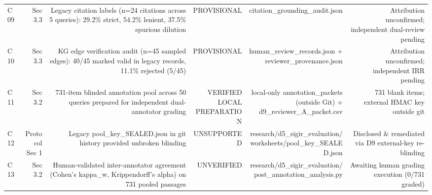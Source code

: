 \begin{table}[t]
\begin{tabular}{lrrrrr}
C09 & Sec 3.3 & Legacy citation labels (n=24 citations across 5 queries): 29.2\% strict, 54.2\% lenient, 37.5\% spurious dilution & PROVISIONAL & citation\_grounding\_audit.json & Attribution unconfirmed; independent dual-review pending \\
C10 & Sec 3.3 & KG edge verification audit (n=45 sampled edges): 40/45 marked valid in legacy records, 11.1\% rejected (5/45) & PROVISIONAL & human\_review\_records.json + reviewer\_provenance.json & Attribution unconfirmed; independent IRR pending \\
C11 & Sec 3.2 & 731-item blinded annotation pool across 50 queries prepared for independent dual-annotator grading & VERIFIED LOCAL PREPARATION & local-only annotation\_packets (outside Git) + d9\_reviewer\_A\_packet.csv & 731 blank items; external HMAC key outside git \\
C12 & Protocol Sec 1 & Legacy pool\_key\_SEALED.json in git history provided unbroken blinding & UNSUPPORTED & research/d5\_sigir\_evaluation/worksheets/pool\_key\_SEALED.json & Disclosed \& remediated via D9 external-key re-blinding \\
C13 & Sec 3.2 & Human-validated inter-annotator agreement (Cohen's kappa\_w, Krippendorff's alpha) on 731 pooled passages & UNVERIFIED & research/d5\_sigir\_evaluation/post\_annotation\_analysis.py & Awaiting human grading execution (0/731 graded) \\
\bottomrule
\end{tabular}
\end{table}
